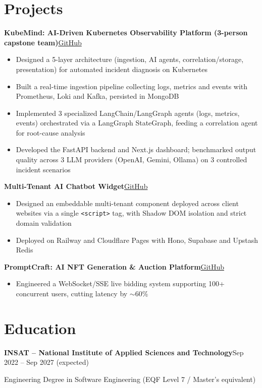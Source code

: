 \documentclass[10pt,a4paper]{article}
\newcommand{\entry}[2]{\vspace{1pt}\noindent\textbf{#1}\hfill{\color{muted}#2}\par}
\newcommand{\gh}[1]{\href{https://github.com/Hsan003/#1}{GitHub}}
\begin{document}
\section{Projects}
\entry{KubeMind: AI-Driven Kubernetes Observability Platform (3-person capstone team)}{\gh{kubemind}}
\begin{itemize}
  \item Designed a 5-layer architecture (ingestion, AI agents, correlation/storage, presentation) for automated incident diagnosis on Kubernetes
  \item Built a real-time ingestion pipeline collecting logs, metrics and events with Prometheus, Loki and Kafka, persisted in MongoDB
  \item Implemented 3 specialized LangChain/LangGraph agents (logs, metrics, events) orchestrated via a LangGraph StateGraph, feeding a correlation agent for root-cause analysis
  \item Developed the FastAPI backend and Next.js dashboard; benchmarked output quality across 3 LLM providers (OpenAI, Gemini, Ollama) on 3 controlled incident scenarios
\end{itemize}
\entry{Multi-Tenant AI Chatbot Widget}{\gh{AI-Assistant-Backend}}
\begin{itemize}
  \item Designed an embeddable multi-tenant component deployed across client websites via a single \texttt{<script>} tag, with Shadow DOM isolation and strict domain validation
  \item Deployed on Railway and Cloudflare Pages with Hono, Supabase and Upstash Redis
\end{itemize}
\entry{PromptCraft: AI NFT Generation \& Auction Platform}{\gh{prompt-craft-back}}
\begin{itemize}
  \item Engineered a WebSocket/SSE live bidding system supporting 100+ concurrent users, cutting latency by $\sim$60\%
\end{itemize}

\section{Education}
\entry{INSAT -- National Institute of Applied Sciences and Technology}{Sep 2022 -- Sep 2027 (expected)}
Engineering Degree in Software Engineering (EQF Level 7 / Master's equivalent)
\end{document}
